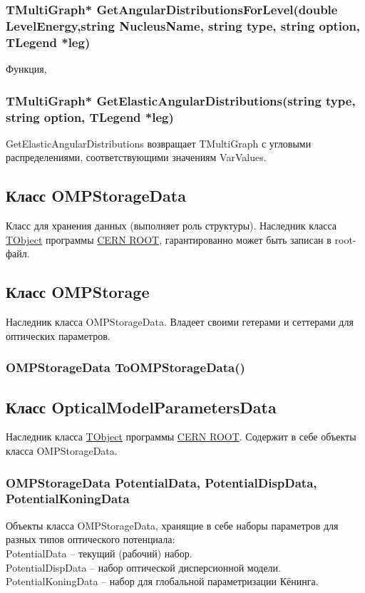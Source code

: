 \documentclass[a4paper,12pt]{extarticle}
\begin{document}
\subsubsection{TMultiGraph* GetAngularDistributionsForLevel(double LevelEnergy,string NucleusName, string type, string option, TLegend *leg)}
Функция, 
\subsubsection{TMultiGraph* GetElasticAngularDistributions(string type, string option, TLegend *leg)}
GetElasticAngularDistributions возвращает TMultiGraph с угловыми распределениями, соответствующими значениям VarValues.
\subsection{Класс OMPStorageData}
Класс для хранения данных (выполняет роль структуры). Наследник класса \href{https://root.cern/doc/master/classTObject.html}{TObject} программы \href{https://root.cern}{CERN ROOT}, гарантированно может быть записан в root-файл. 
\subsection{Класс OMPStorage}
Наследник класса OMPStorageData. Владеет своими гетерами и сеттерами для оптических параметров.
\subsubsection{OMPStorageData ToOMPStorageData()}

\subsection{Класс OpticalModelParametersData}
Наследник класса \href{https://root.cern/doc/master/classTObject.html}{TObject} программы \href{https://root.cern}{CERN ROOT}. Содержит в себе объекты класса OMPStorageData.
\subsubsection{OMPStorageData PotentialData, PotentialDispData, PotentialKoningData}
Объекты класса OMPStorageData, хранящие в себе наборы параметров для разных типов оптического потенциала:\\
PotentialData -- текущий (рабочий) набор.\\
PotentialDispData -- набор оптической дисперсионной модели.\\
PotentialKoningData -- набор для глобальной параметризации Кёнинга.
\end{document}
